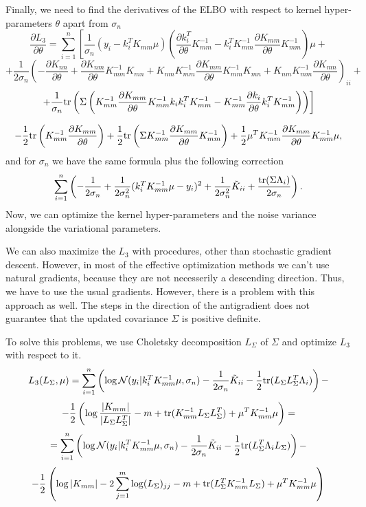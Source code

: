 \documentclass[12pt]{article}
\begin{document}
		Finally, we need to find the derivatives of the ELBO with respect to kernel hyper-parameters $\theta$ apart from $\sigma_n$
		$$\frac{\partial L_3} {\partial \theta} = \sum_{i = 1}^n \left [ \frac 1 {\sigma_n} (y_i - k_i^T K_{mm} \mu) \left(\frac{\partial k_i^T}{\partial \theta} K_{mm}^{-1} - k_i^T K_{mm}^{-1} \frac{\partial K_{mm}}{\partial \theta} K_{mm}^{-1} \right)\mu + \right.$$
		$$\left. +\frac 1 {2 \sigma_n} \left (- \frac{\partial K_{nn}}{\partial \theta} +  \frac{\partial K_{nm}}{\partial \theta} K_{mm}^{-1} K_{mn} + K_{nm} K_{mm}^{-1} \frac{\partial K_{mm}}{\partial \theta} K_{mm}^{-1} K_{mn} + K_{nm} K_{mm}^{-1} \frac{\partial K_{mn}}{\partial \theta}\right)_ {ii} + \right.$$
		$$\left. +  \frac 1 {\sigma_n} \mbox{tr}\left( \Sigma \left( K_{mm}^{-1} \frac{\partial K_{mm}}{\partial \theta} K_{mm}^{-1} k_i k_i^T K_{mm}^{-1}  -  K_{mm}^{-1} \frac{\partial k_{i}}{\partial \theta}k_i^T K_{mm}^{-1}\right)\right)\right]$$

		$$ - \frac 1 2 \mbox{tr}\left(K_{mm}^{-1} \frac{\partial K_{mm}}{\partial \theta}\right) + \frac 1 2 \mbox{tr}\left(\Sigma K_{mm}^{-1} \frac{\partial K_{mm}}{\partial \theta} K_{mm}^{-1} \right)+ \frac 1 2 \mu^T K_{mm}^{-1} \frac{\partial K_{mm}}{\partial \theta} K_{mm}^{-1}\mu,$$
		and for $\sigma_n$ we have the same formula plus the following correction
		$$\sum_{i = 1}^{n} \left(-\frac{1}{2\sigma_n} + \frac 1 {2 \sigma_n^2} (k_i^T K_{mm}^{-1} \mu - y_i)^2 + \frac 1 {2 \sigma_n^2} \tilde K_{ii} + \frac {\mbox{tr}(\Sigma \Lambda_i)}{2 \sigma_n}\right).$$
		Now, we can optimize the kernel hyper-parameters and the noise variance alongside the variational parameters. 
		
		We can also maximize the $L_3$ with procedures, other than stochastic gradient descent. However, in most of the effective optimization methods we can't use natural gradients, because they are not necesserily a descending direction. Thus, we have to use the usual gradients. However, there is a problem with this approach as well. The steps in the direction of the antigradient does not guarantee that the updated covariance $\Sigma$ is positive definite. 

		To solve this problems, we use Choletsky decomposition $L_{\Sigma}$ of $\Sigma$ and optimize $L_3$ with respect to it.
		$$L_3(L_{\Sigma}, \mu) = \sum_{i = 1}^{n} \left( \log \mathcal{N}(y_i | k_i^T K_{mm}^{-1} \mu, \sigma_n) - \frac 1 {2 \sigma_n} \tilde K_{ii} - \frac 1 2 \mbox{tr} (L_{\Sigma} L_{\Sigma}^T \Lambda_i) \right) - $$
		$$ -\frac 1 2 \left (\log \frac {|K_{mm}|} {|L_{\Sigma} L_{\Sigma}^T|} - m + \mbox{tr}(K_{mm}^{-1} L_{\Sigma} L_{\Sigma}^T) + \mu^T K_{mm}^{-1} \mu \right) = $$
		$$ = \sum_{i = 1}^{n} \left( \log \mathcal{N}(y_i | k_i^T K_{mm}^{-1} \mu, \sigma_n) - \frac 1 {2 \sigma_n} \tilde K_{ii} - \frac 1 2 \mbox{tr} (L_{\Sigma}^T \Lambda_iL_{\Sigma}) \right) - $$
		$$ -\frac 1 2 \left (\log |K_{mm}| - 2 \sum_{j=1}^{m}\log (L_{\Sigma})_{jj} - m + \mbox{tr}(L_{\Sigma}^T K_{mm}^{-1} L_{\Sigma}) + \mu^T K_{mm}^{-1} \mu \right)$$
\end{document}
